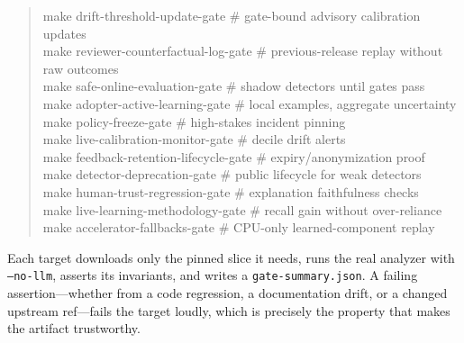 \documentclass[11pt]{article}
\newcommand{\code}[1]{\texttt{#1}}
\begin{document}
\begin{quote}
make drift-threshold-update-gate \hspace{0.02em}\# gate-bound advisory calibration updates\\
make reviewer-counterfactual-log-gate \quad\# previous-release replay without raw outcomes\\
make safe-online-evaluation-gate \quad\# shadow detectors until gates pass\\
make adopter-active-learning-gate \quad\# local examples, aggregate uncertainty\\
make policy-freeze-gate \hspace{2.35em}\# high-stakes incident pinning\\
make live-calibration-monitor-gate \quad\# decile drift alerts\\
make feedback-retention-lifecycle-gate \quad\# expiry/anonymization proof\\
make detector-deprecation-gate \quad\# public lifecycle for weak detectors\\
make human-trust-regression-gate \quad\# explanation faithfulness checks\\
make live-learning-methodology-gate \quad\# recall gain without over-reliance\\
make accelerator-fallbacks-gate \quad\# CPU-only learned-component replay
\end{quote}

\noindent
Each target downloads only the pinned slice it needs, runs the real analyzer with \code{--no-llm},
asserts its invariants, and writes a \code{gate-summary.json}. A failing assertion---whether from a
code regression, a documentation drift, or a changed upstream ref---fails the target loudly, which is
precisely the property that makes the artifact trustworthy.
\end{document}
